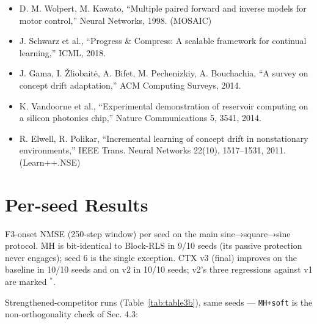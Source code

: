 \documentclass[11pt]{article}
\providecommand{\tightlist}{\setlength{\itemsep}{0pt}%
  \setlength{\parskip}{0pt}}
\begin{document}
\begin{itemize}
  \begin{enumerate}
  \def\labelenumi{\arabic{enumi}.}
  \setcounter{enumi}{2021}
  \tightlist
  \item
    Code: github.com/leonardbereska/multiheadreservoir.
  \end{enumerate}
\item
  D. M. Wolpert, M. Kawato, ``Multiple paired forward and inverse models
  for motor control,'' Neural Networks, 1998. (MOSAIC)
\item
  J. Schwarz et al., ``Progress \& Compress: A scalable framework for
  continual learning,'' ICML, 2018.
\item
  J. Gama, I. Žliobaitė, A. Bifet, M. Pechenizkiy, A. Bouchachia, ``A
  survey on concept drift adaptation,'' ACM Computing Surveys, 2014.
\item
  K. Vandoorne et al., ``Experimental demonstration of reservoir
  computing on a silicon photonics chip,'' Nature Communications 5,
  3541, 2014.
\item
  R. Elwell, R. Polikar, ``Incremental learning of concept drift in
  nonstationary environments,'' IEEE Trans. Neural Networks 22(10),
  1517--1531, 2011. (Learn++.NSE)
\end{itemize}

\appendix
\section{Per-seed Results}\label{appendix-a-per-seed-results}

F3-onset NMSE (250-step window) per seed on the main
sine→square→sine protocol. MH is bit-identical to Block-RLS in 9/10
seeds (its passive protection never engages); seed 6 is the single
exception. CTX v3 (final) improves on the baseline in 10/10 seeds and
on v2 in 10/10 seeds; v2's three regressions against v1 are marked \(^{*}\).

\begin{table}[t]
\centering\small
\caption{Per-seed F3-onset NMSE (250-step window) on the main
protocol. MH is bit-identical to Block-RLS in 9/10 seeds; CTX v3
improves on the baseline in 10/10 and on v2 in 10/10; v2's three
regressions against v1 are marked $^{*}$.}
\label{tab:tableA}

\end{table}

Strengthened-competitor runs (Table~\ref{tab:table3b}), same seeds ---
\texttt{MH+soft} is the non-orthogonality check of Sec. 4.3:

\begin{table}[h]
\centering\small
\caption{Strengthened-competitor per-seed runs; MH+soft is the
non-orthogonality check of Sec. 4.3.}
\label{tab:tableB}

\end{table}
\end{document}
